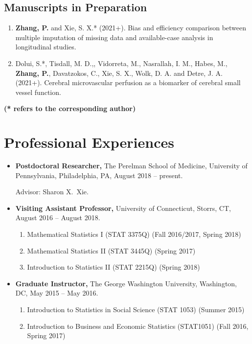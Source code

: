 \documentclass[margin]{res}
\begin{document}
\begin{resume}
\subsection{Manuscripts in Preparation}
\begin{enumerate}
	\item {\bf Zhang, P.} and {\sc Xie, S. X.*} (2021+). Bias 
	and efficiency comparison between multiple imputation of missing 
	data and available-case analysis in longitudinal studies. 
	\item {\sc Dolui, S.*, Tisdall, M. D.,, Vidorreta, M., 
	Nasrallah, I. M., Habes, M.}, {\bf Zhang, P.}, {\sc 
	Davatzokos, C., Xie, S. X., Wolk, D. A.} and {\sc Detre, J. A.} 
	(2021+). Cerebral microvascular perfusion as a biomarker of 
	cerebral small vessel function.
\end{enumerate}

{\bf (* refers to the corresponding author)}

\section{Professional Experiences}
\begin{itemize}
	\item {\bf Postdoctoral Researcher,} The Perelman School of 
	Medicine, University of Pennsylvania, Philadelphia, PA, August 
	2018 -- present.
	
	Advisor: Sharon X.\ Xie.
	\item {\bf Visiting Assistant Professor,} University of Connecticut, Storrs, CT, August 2016 -- August 2018.
	\begin{enumerate}
		\item Mathematical Statistics {\rm I} (STAT 3375Q) (Fall 2016/2017, Spring 2018)
		\item Mathematical Statistics {\rm II} (STAT 3445Q) (Spring 2017)
		\item Introduction to Statistics {\rm II} (STAT 2215Q) (Spring 2018)
	\end{enumerate}
	
	\item {\bf Graduate Instructor,} The George Washington University, Washington, DC, May 2015 -- May 2016.
	\begin{enumerate}
		\item Introduction to Statistics in Social Science (STAT 1053) (Summer 2015)
		\item Introduction to Business and Economic Statistics (STAT1051) (Fall 2016, Spring 2017)
	\end{enumerate}
	

\end{itemize}
\end{resume}
\end{document}
